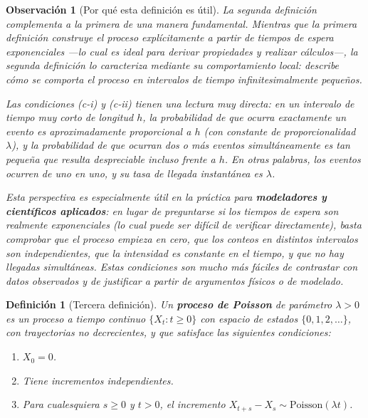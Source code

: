 \documentclass[12pt]{book}
\newtheorem{definition}{Definición}[chapter]
\newtheorem{remark}{Observación}[chapter]
\begin{document}
\begin{remark}[Por qué esta definición es útil]
La segunda definición complementa a la primera de una manera fundamental. Mientras que la primera definición \emph{construye} el proceso explícitamente a partir de tiempos de espera exponenciales —lo cual es ideal para derivar propiedades y realizar cálculos—, la segunda definición lo \emph{caracteriza} mediante su comportamiento local: describe cómo se comporta el proceso en intervalos de tiempo infinitesimalmente pequeños.

Las condiciones (c-i) y (c-ii) tienen una lectura muy directa: en un intervalo de tiempo muy corto de longitud $h$, la probabilidad de que ocurra exactamente un evento es aproximadamente proporcional a $h$ (con constante de proporcionalidad $\lambda$), y la probabilidad de que ocurran dos o más eventos simultáneamente es tan pequeña que resulta despreciable incluso frente a $h$. En otras palabras, \emph{los eventos ocurren de uno en uno}, y su tasa de llegada instantánea es $\lambda$.

Esta perspectiva es especialmente útil en la práctica para \textbf{modeladores y científicos aplicados}: en lugar de preguntarse si los tiempos de espera son realmente exponenciales (lo cual puede ser difícil de verificar directamente), basta comprobar que el proceso empieza en cero, que los conteos en distintos intervalos son independientes, que la intensidad es constante en el tiempo, y que no hay llegadas simultáneas. Estas condiciones son mucho más fáciles de contrastar con datos observados y de justificar a partir de argumentos físicos o de modelado.

\end{remark}


\begin{definition}[Tercera definición]
Un \textbf{proceso de Poisson} de parámetro $\lambda > 0$ es un proceso a tiempo continuo $\{X_t : t \ge 0\}$ con espacio de estados $\{0, 1, 2, \ldots\}$, con trayectorias no decrecientes, y que satisface las siguientes condiciones:
\begin{enumerate}
    \item[\normalfont(a)] $X_0 = 0$.
    \item[\normalfont(b)] Tiene incrementos independientes.
    \item[\normalfont(c)] Para cualesquiera $s \ge 0$ y $t > 0$, el incremento $X_{t+s} - X_s \sim \mathrm{Poisson}(\lambda t)$.
\end{enumerate}
\end{definition}
\end{document}

